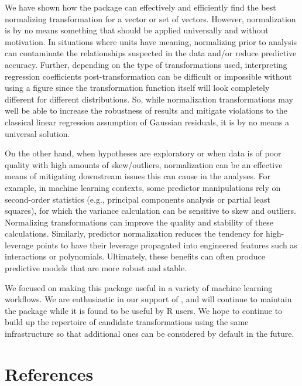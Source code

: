 We have shown how the  package can effectively and
efficiently find the best normalizing transformation for a vector or set
of vectors. However, normalization is by no means something that should
be applied universally and without motivation. In situations where units
have meaning, normalizing prior to analysis can contaminate the
relationships suspected in the data and/or reduce predictive accuracy.
Further, depending on the type of transformations used, interpreting
regression coefficients post-transformation can be difficult or
impossible without using a figure since the transformation function
itself will look completely different for different distributions. So,
while normalization transformations may well be able to increase the
robustness of results and mitigate violations to the classical linear
regression assumption of Gaussian residuals, it is by no means a
universal solution.

On the other hand, when hypotheses are exploratory or when data is of
poor quality with high amounts of skew/outliers, normalization can be an
effective means of mitigating downstream issues this can cause in the
analyses. For example, in machine learning contexts, some predictor
manipulations rely on second-order statistics (e.g., principal
components analysis or partial least squares), for which the variance
calculation can be sensitive to skew and outliers. Normalizing
transformations can improve the quality and stability of these
calculations. Similarly, predictor normalization reduces the tendency
for high-leverage points to have their leverage propagated into
engineered features such as interactions or polynomials. Ultimately,
these benefits can often produce predictive models that are more robust
and stable.

We focused on making this package useful in a variety of machine
learning workflows. We are enthusiastic in our support of
, and will continue to maintain the package while it
is found to be useful by R users. We hope to continue to build up the
repertoire of candidate transformations using the same infrastructure so
that additional ones can be considered by default in the future.

\hypertarget{references}{%
\section{References}\label{references}}

\begin{verbatim}
\end{verbatim}



\address{%
Ryan A. Peterson\\
Department of Biostatistics and Informatics\\%
University of Colorado Anschutz Medical Campus 13001 East 17th Place
Aurora, Colorado 80045 ORCID: 0000-0002-4650-5798\\
%
\url{https://petersonr.github.io/}\\%
%
%
}

